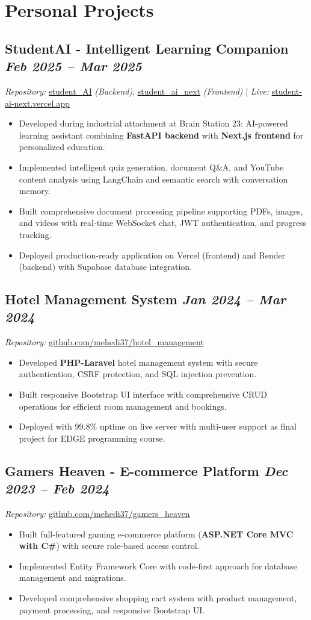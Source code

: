 \documentclass[10pt, a4paper]{article}
\newcommand{\datedsubsection}[2]{%
  \subsection*{#1 \hfill \small\textit{#2}}%
}
\newcommand{\resitem}[1]{\item #1} %
\begin{document}
\section{Personal Projects}

\datedsubsection{StudentAI - Intelligent Learning Companion}{Feb 2025 -- Mar 2025}
\textit{Repository:} \href{https://github.com/mehedi37/student_AI}{student\_AI} \textit{(Backend)}, \href{https://github.com/mehedi37/student_ai_next}{student\_ai\_next} \textit{(Frontend)} | \textit{Live:} \href{https://student-ai-next.vercel.app/}{student-ai-next.vercel.app}
\begin{itemize}
    \resitem{Developed during industrial attachment at Brain Station 23: AI-powered learning assistant combining \textbf{FastAPI backend} with \textbf{Next.js frontend} for personalized education.}
    \resitem{Implemented intelligent quiz generation, document Q\&A, and YouTube content analysis using LangChain and semantic search with conversation memory.}
    \resitem{Built comprehensive document processing pipeline supporting PDFs, images, and videos with real-time WebSocket chat, JWT authentication, and progress tracking.}
    \resitem{Deployed production-ready application on Vercel (frontend) and Render (backend) with Supabase database integration.}
\end{itemize}

\datedsubsection{Hotel Management System}{Jan 2024 -- Mar 2024}
\textit{Repository:} \href{https://github.com/mehedi37/hotel_management}{github.com/mehedi37/hotel\_management}
\begin{itemize}
    \resitem{Developed \textbf{PHP-Laravel} hotel management system with secure authentication, CSRF protection, and SQL injection prevention.}
    \resitem{Built responsive Bootstrap UI interface with comprehensive CRUD operations for efficient room management and bookings.}
    \resitem{Deployed with 99.8\% uptime on live server with multi-user support as final project for EDGE programming course.}
\end{itemize}

\datedsubsection{Gamers Heaven - E-commerce Platform}{Dec 2023 -- Feb 2024}
\textit{Repository:} \href{https://github.com/mehedi37/gamers_heaven}{github.com/mehedi37/gamers\_heaven}
\begin{itemize}
    \resitem{Built full-featured gaming e-commerce platform (\textbf{ASP.NET Core MVC with C\#}) with secure role-based access control.}
    \resitem{Implemented Entity Framework Core with code-first approach for database management and migrations.}
    \resitem{Developed comprehensive shopping cart system with product management, payment processing, and responsive Bootstrap UI.}
\end{itemize}
\end{document}
